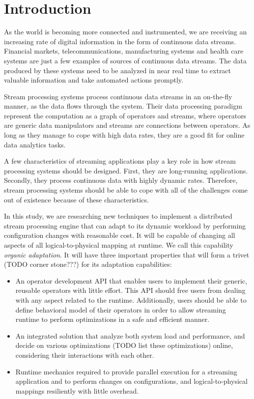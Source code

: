 \section{Introduction}\label{sec:introduction}

As the world is becoming more connected and instrumented, we are receiving an increasing rate of digital information in the form of continuous data streams. Financial markets, telecommunications, manufacturing systems and health care systems are just a few examples of sources of continuous data streams. The data produced by these systems need to be analyzed in near real time to extract valuable information and take automated actions promptly. 

Stream processing systems process continuous data streams in an on-the-fly manner, as the data flows through the system. Their data processing paradigm represent the computation as a graph of operators and streams, where operators are generic data manipulators and streams are connections between operators. As long as they manage to cope with high data rates, they are a good fit for online data analytics tasks. 

A few characteristics of streaming applications play a key role in how stream processing systems should be designed. First, they are long-running applications. Secondly, they process continuous data with highly dynamic rates. Therefore, stream processing systems should be able to cope with all of the challenges come out of existence because of these characteristics. 

In this study, we are researching new techniques to implement a distributed stream processing engine that can adapt to its dynamic workload by performing configuration changes with reasonable cost. It will be capable of changing all aspects of all logical-to-physical mapping at runtime. We call this capability \textit{organic adaptation}. It will have three important properties that will form a trivet (TODO corner stone???) for its adaptation capabilities:

\begin{itemize}

\item An operator development API that enables users to implement their generic, reusable operators with little effort. This API should free users from dealing with any aspect related to the runtime. Additionally, users should be able to define behavioral model of their operators in order to allow streaming runtime to perform optimizations in a safe and efficient manner.

\item An integrated solution that analyze both system load and performance, and decide on various optimizations (TODO list these optimizations) online, considering their interactions with each other.

\item Runtime mechanics required to provide parallel execution for a streaming application and to perform changes on configurations, and logical-to-physical mappings resiliently with little overhead.

\end{itemize}